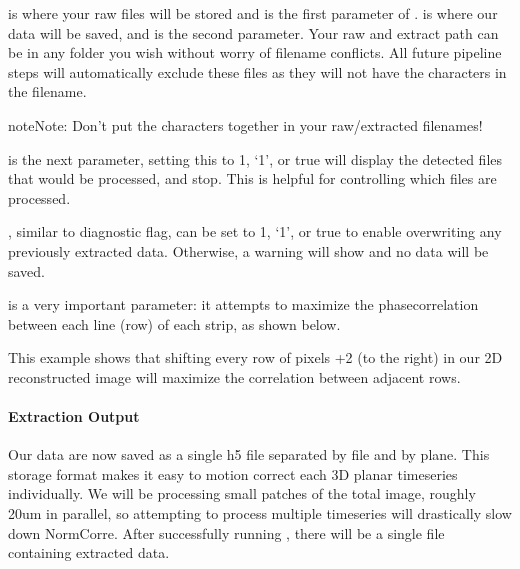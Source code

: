 \documentclass[letterpaper,10pt,english]{sphinxmanual}
\begin{document}
\sphinxAtStartPar
{} is where your raw  files will be stored and is the first parameter of {\hyperref[\detokenize{api/core:convertScanImageTiffToVolume}]{}}.
 is where our data will be saved, and is the second parameter.
\sphinxhyphen{} Your raw and extract path can be in any folder you wish without worry of file\sphinxhyphen{}name conflicts.
\sphinxhyphen{} All future pipeline steps will automatically exclude these files as they will not have the characters  in the filename.

\begin{sphinxadmonition}{note}{Note:}
\sphinxAtStartPar
Don’t put the characters  together in your raw/extracted filenames!
\end{sphinxadmonition}

\sphinxAtStartPar
{} is the next parameter, setting this to 1, ‘1’, or true will display the detected files that would be processed, and stop. This is helpful for controlling which files are processed.

\sphinxAtStartPar
{}, similar to diagnostic flag, can be set to 1, ‘1’, or true to enable overwriting any previously extracted data. Otherwise, a warning will show and no data will be saved.

\sphinxAtStartPar
{} is a very important parameter: it attempts to maximize the phase\sphinxhyphen{}correlation between each line (row) of each strip, as shown below.

\noindent{}

\sphinxAtStartPar
This example shows that shifting every  row of pixels +2 (to the right) in our 2D reconstructed image will maximize the correlation between adjacent rows.


\paragraph{Extraction Output}
\label{\detokenize{user_guide/pre_processing:extraction-output}}
\sphinxAtStartPar
Our data are now saved as a single h5 file separated by file and by plane. This storage format
makes it easy to motion correct each 3D planar time\sphinxhyphen{}series individually. We will be processing small patches of the total image,
roughly 20um in parallel, so attempting to process multiple time\sphinxhyphen{}series will drastically slow down NormCorre.
After successfully running {\hyperref[\detokenize{api/core:convertScanImageTiffToVolume}]{}}, there will be a single  file containing extracted data.
\end{document}
